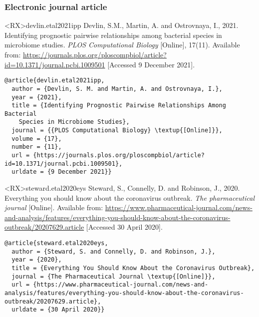 \documentclass[10pt,a4paper]{article}
\begin{document}
\subsubsection*{Electronic journal article}

\begin{bibexbox}<RX>{devlin.etal2021ipp}
  Devlin, S.M., Martin, A. and Ostrovnaya, I., 2021. Identifying prognostic pairwise relationships among bacterial species in microbiome studies. \emph{PLOS Computational Biology} [Online], 17(11). Available from: \url{https://journals.plos.org/ploscompbiol/article?id=10.1371/journal.pcbi.1009501} [Accessed 9 December 2021].
  \tcblower
\begin{Verbatim}
@article{devlin.etal2021ipp,
  author = {Devlin, S. M. and Martin, A. and Ostrovnaya, I.},
  year = {2021},
  title = {Identifying Prognostic Pairwise Relationships Among Bacterial
    Species in Microbiome Studies},
  journal = {{PLOS Computational Biology} \textup{[Online]}},
  volume = {17},
  number = {11},
  url = {https://journals.plos.org/ploscompbiol/article?id=10.1371/journal.pcbi.1009501},
  urldate = {9 December 2021}}
\end{Verbatim}
\end{bibexbox}

\begin{bibexbox}<RX>{steward.etal2020eys}
  Steward, S., Connelly, D. and Robinson, J., 2020. Everything you should know about the coronavirus outbreak. \emph{The pharmaceutical journal} [Online]. Available from: \url{https://www.pharmaceutical-journal.com/news-and-analysis/features/everything-you-should-know-about-the-coronavirus-outbreak/20207629.article} [Accessed 30 April 2020].
  \tcblower
\begin{Verbatim}
@article{steward.etal2020eys,
  author = {Steward, S. and Connelly, D. and Robinson, J.},
  year = {2020},
  title = {Everything You Should Know About the Coronavirus Outbreak},
  journal = {The Pharmaceutical Journal \textup{[Online]}},
  url = {https://www.pharmaceutical-journal.com/news-and-analysis/features/everything-you-should-know-about-the-coronavirus-outbreak/20207629.article},
  urldate = {30 April 2020}}
\end{Verbatim}
\end{bibexbox}
\end{document}

